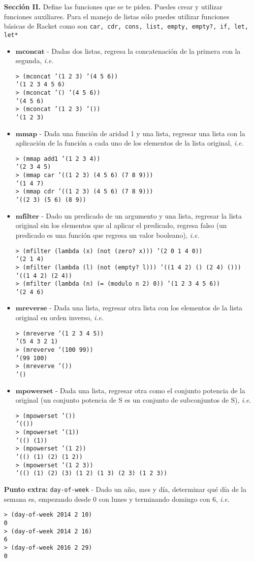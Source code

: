 \documentclass{article}
\begin{document}
\textbf{Sección II.} Define las funciones que se te piden. Puedes crear
y utilizar funciones auxiliares. Para el manejo de listas sólo puedes
utilizar funciones básicas de Racket como son \texttt{car, cdr, cons,
  list, empty, empty?, if, let, let*}

\begin{itemize}
\item $\textbf{mconcat}$ - Dadas dos listas, regresa la concatenación
  de la primera con la segunda, \textit{i.e.}
\begin{verbatim}
> (mconcat ’(1 2 3) ’(4 5 6))
’(1 2 3 4 5 6)
> (mconcat ’() ’(4 5 6))
’(4 5 6)
> (mconcat ’(1 2 3) ’())
’(1 2 3)
\end{verbatim}

\item $\textbf{mmap}$ - Dada una función de aridad 1 y una lista,
  regresar una lista con la aplicación de la función a cada uno de los
  elementos de la lista original, \textit{i.e.}
\begin{verbatim}
> (mmap add1 ’(1 2 3 4))
’(2 3 4 5)
> (mmap car ’((1 2 3) (4 5 6) (7 8 9)))
’(1 4 7)
> (mmap cdr ’((1 2 3) (4 5 6) (7 8 9)))
’((2 3) (5 6) (8 9))
\end{verbatim}

\newpage

\item $\textbf{mfilter}$ - Dado un predicado de un argumento y una
  lista, regresar la lista original sin los elementos que al aplicar
  el predicado, regresa falso (un predicado es una función que
  regresa un valor booleano), \textit{i.e.}
\begin{verbatim}
> (mfilter (lambda (x) (not (zero? x))) ’(2 0 1 4 0))
’(2 1 4)
> (mfilter (lambda (l) (not (empty? l))) ’((1 4 2) () (2 4) ()))
’((1 4 2) (2 4))
> (mfilter (lambda (n) (= (modulo n 2) 0)) ’(1 2 3 4 5 6))
’(2 4 6)
\end{verbatim}

\item $\textbf{mreverse}$ - Dada una lista, regresar otra lista con
  los elementos de la lista original en orden inverso, \textit{i.e.}
\begin{verbatim}
> (mreverve ’(1 2 3 4 5))
’(5 4 3 2 1)
> (mreverve ’(100 99))
’(99 100)
> (mreverve ’())
’()
\end{verbatim}

\item $\textbf{mpowerset}$ - Dada una lista, regresar otra como el
  conjunto potencia de la original (un conjunto potencia de S es un
  conjunto de subconjuntos de S), \textit{i.e.}
\begin{verbatim}
> (mpowerset ’())
’(())
> (mpowerset ’(1))
’(() (1))
> (mpowerset ’(1 2))
’(() (1) (2) (1 2))
> (mpowerset ’(1 2 3))
’(() (1) (2) (3) (1 2) (1 3) (2 3) (1 2 3))
\end{verbatim}
\end{itemize}

\textbf{Punto extra:} \texttt{day-of-week} - Dado un año, mes y día,
determinar qué día de la semana es, empezando desde 0 con lunes y
terminando domingo con 6, \textit{i.e.}
\begin{verbatim}
> (day-of-week 2014 2 10)
0
> (day-of-week 2014 2 16)
6
> (day-of-week 2016 2 29)
0
\end{verbatim}
\end{document}
